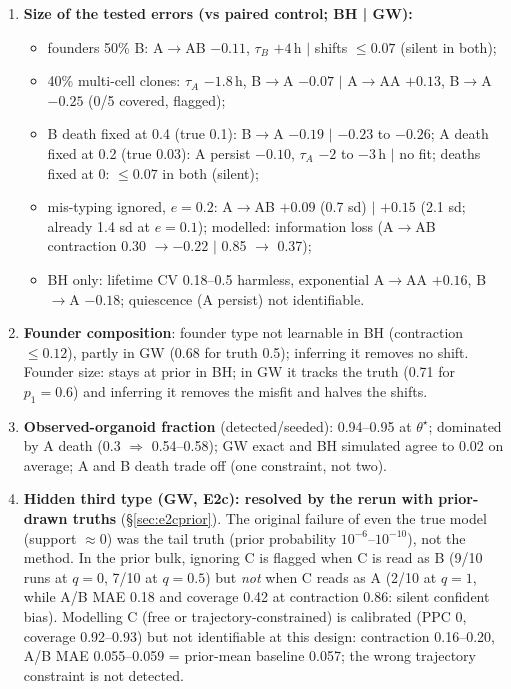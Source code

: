 \documentclass[10pt,a4paper]{article}
\newcommand{\tA}{$\tau_A$}
\newcommand{\tB}{$\tau_B$}
\begin{document}
\begin{enumerate}[leftmargin=1.4em]
\item \textbf{Size of the tested errors (vs paired control; BH | GW):}
  \begin{itemize}
  \item founders 50\% B: A$\to$AB $-0.11$, \tB{} $+4$\,h $|$ shifts $\le 0.07$ (silent in both);
  \item 40\% multi-cell clones: \tA{} $-1.8$\,h, B$\to$A $-0.07$ $|$ A$\to$AA $+0.13$, B$\to$A $-0.25$ (0/5 covered, flagged);
  \item B death fixed at 0.4 (true 0.1): B$\to$A $-0.19$ $|$ $-0.23$ to $-0.26$; A death fixed at 0.2 (true 0.03): A persist $-0.10$, \tA{} $-2$ to $-3$\,h $|$ no fit; deaths fixed at 0: $\le 0.07$ in both (silent);
  \item mis-typing ignored, $e=0.2$: A$\to$AB $+0.09$ (0.7 sd) $|$ $+0.15$ (2.1 sd; already 1.4 sd at $e=0.1$); modelled: information loss (A$\to$AB contraction 0.30 $\to -0.22$ $|$ 0.85 $\to$ 0.37);
  \item BH only: lifetime CV 0.18--0.5 harmless, exponential A$\to$AA $+0.16$, B$\to$A $-0.18$; quiescence (A persist) not identifiable.
  \end{itemize}
\item \textbf{Founder composition}: founder type not learnable in BH (contraction $\le 0.12$), partly in GW (0.68 for truth 0.5); inferring it removes no shift. Founder size: stays at prior in BH; in GW it tracks the truth (0.71 for $p_1=0.6$) and inferring it removes the misfit and halves the shifts.
\item \textbf{Observed-organoid fraction} (detected/seeded): 0.94--0.95 at $\theta^\star$; dominated by A death (0.3 $\Rightarrow$ 0.54--0.58); GW exact and BH simulated agree to 0.02 on average; A and B death trade off (one constraint, not two).
\item \textbf{Hidden third type (GW, E2c): resolved by the rerun with prior-drawn truths} (\S\ref{sec:e2cprior}). The original failure of even the true model (support $\approx 0$) was the tail truth (prior probability $10^{-6}$--$10^{-10}$), not the method. In the prior bulk, ignoring C is flagged when C is read as B (9/10 runs at $q=0$, 7/10 at $q=0.5$) but \emph{not} when C reads as A (2/10 at $q=1$, while A/B MAE 0.18 and coverage 0.42 at contraction 0.86: silent confident bias). Modelling C (free or trajectory-constrained) is calibrated (PPC 0, coverage 0.92--0.93) but not identifiable at this design: contraction 0.16--0.20, A/B MAE 0.055--0.059 = prior-mean baseline 0.057; the wrong trajectory constraint is not detected.

\end{enumerate}
\end{document}
